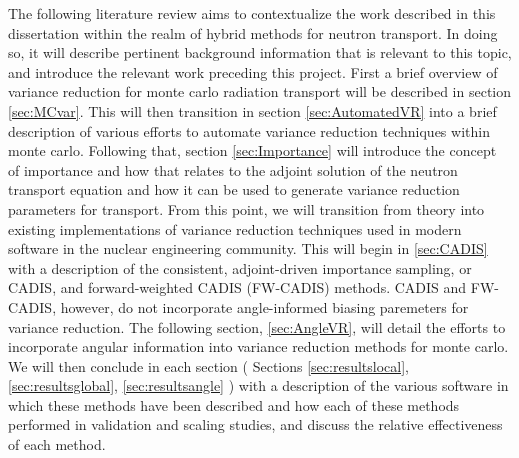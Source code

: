 The following literature review aims to contextualize the work described in this dissertation within the realm of hybrid methods for neutron transport. In doing so, it will describe pertinent background information that is relevant to this topic, and introduce the relevant work preceding this project. 
First a brief overview of variance reduction for monte carlo radiation transport will be described in section \ref{sec:MCvar}.
This will then transition in section \ref{sec:AutomatedVR} into a brief description of various efforts to automate variance reduction techniques within monte carlo. 
Following that, section \ref{sec:Importance} will introduce the concept of importance and how that relates to the adjoint solution of the neutron transport equation and how it can be used to generate variance reduction parameters for transport.
From this point, we will transition from theory into existing implementations of variance reduction techniques used in modern software in the nuclear engineering community. This will begin in \ref{sec:CADIS} with a description of the consistent, adjoint-driven importance sampling, or CADIS, and forward-weighted CADIS (FW-CADIS) methods.
CADIS and FW-CADIS, however, do not incorporate angle-informed biasing paremeters for variance reduction. 
The following section, \ref{sec:AngleVR}, will detail the efforts to incorporate angular information into variance reduction methods for monte carlo. 
We will then conclude in each section ( Sections \ref{sec:resultslocal}, \ref{sec:resultsglobal}, \ref{sec:resultsangle} ) with a description of the various software in which these methods have been described and how each of these methods performed in validation and scaling studies, and discuss the relative effectiveness of each method. 